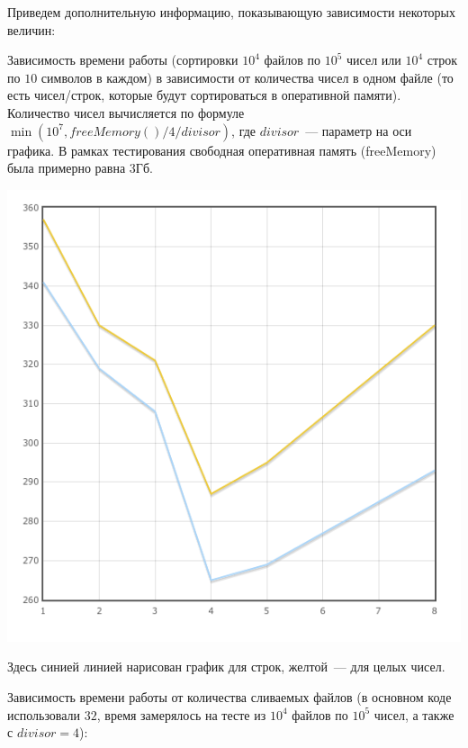 \documentclass[11pt,a4paper,oneside]{article}
\begin{document}
Приведем дополнительную информацию, показывающую зависимости некоторых величин:

Зависимость времени работы (сортировки $10^4$ файлов по $10^5$ чисел или $10^4$ строк по $10$ символов в каждом) в зависимости от количества чисел в одном файле (то есть чисел/строк, которые будут сортироваться в оперативной памяти). Количество чисел вычисляется по формуле $\min(10^7, freeMemory() / 4 / divisor)$, где $divisor$~--- параметр на оси графика. В рамках тестирования свободная оперативная память (freeMemory) была примерно равна 3Гб.

\includegraphics[natwidth=162bp,natheight=227bp]{img/02.png}

Здесь синией линией нарисован график для строк, желтой~--- для целых чисел.

Зависимость времени работы от количества сливаемых файлов (в основном коде использовали $32$, время замерялось на тесте из $10^4$ файлов по $10^5$ чисел, а также с $divisor = 4$):
\end{document}
